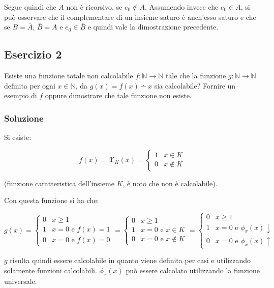 Segue quindi che $A$ non è ricorsivo, se $e_0 \notin A$.
Assumendo invece che $e_0 \in A$, si può osservare che il complementare di un insieme saturo è anch'esso saturo e che se $B = \overline{A}$, $\overline{B} = A$ e $e_0 \in \overline{B}$ e quindi vale la dimostrazione precedente.

\subsection{Esercizio 2}

Esiste una funzione totale non calcolabile $f : \mathbb{N} \rightarrow \mathbb{N}$ tale che la funzione $g : \mathbb{N} \rightarrow \mathbb{N}$ definita per ogni $x \in \mathbb{N}$, da $g(x) = f(x) \dotminus x$ sia calcolabile? Fornire un esempio di $f$ oppure dimostrare che tale funzione non esiste.

\subsubsection{Soluzione}

Si esiste:

$$
f(x) = \mathcal{X}_K(x) = \begin{cases}
1 &x \in K\\
0 &x \notin K
\end{cases} 
$$

(funzione caratteristica dell'insieme $K$, è noto che non è calcolabile).

Con questa funzione si ha che:

$$
g(x) = \begin{cases}
0 &x \geq 1 \\
1 &x = 0 \text{ e } f(x) = 1 \\
0 &x = 0 \text{ e } f(x) = 0 
\end{cases} = \begin{cases}
0 &x \geq 1 \\
1 &x = 0 \text{ e } x \in K \\
0 &x = 0 \text{ e } x \notin K 
\end{cases} = \begin{cases}
0 &x \geq 1 \\
1 &x = 0 \text{ e } \phi_x(x)\downarrow \\
0 &x = 0 \text{ e } \phi_x(x)\uparrow 
\end{cases}
$$

$g$ risulta quindi essere calcolabile in quanto viene definita per casi e utilizzando solamente funzioni calcolabili. $\phi_x(x)$ può essere calcolato utilizzando la funzione universale.

